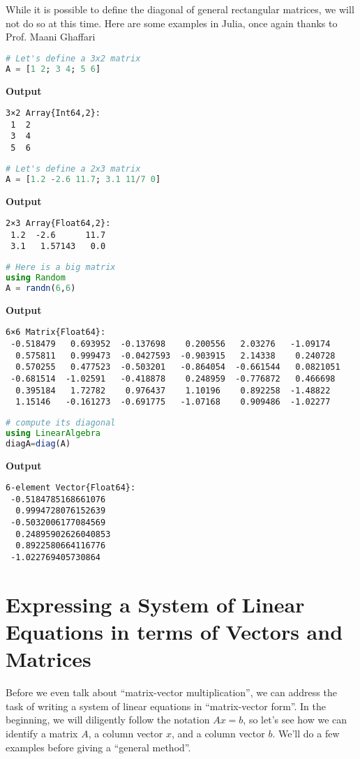 While it is possible to define the diagonal of general rectangular matrices, we will not do so at this time. Here are some examples in Julia, once again thanks to Prof. Maani Ghaffari
\begin{lstlisting}[language=Julia,style=mystyle]
# Let's define a 3x2 matrix
A = [1 2; 3 4; 5 6]
\end{lstlisting}
\textbf{Output}
\begin{verbatim}
3×2 Array{Int64,2}:
 1  2
 3  4
 5  6
\end{verbatim}
\begin{lstlisting}[language=Julia,style=mystyle]
# Let's define a 2x3 matrix
A = [1.2 -2.6 11.7; 3.1 11/7 0]
\end{lstlisting}
\textbf{Output}
\begin{verbatim}
2×3 Array{Float64,2}:
 1.2  -2.6      11.7
 3.1   1.57143   0.0
\end{verbatim}
\begin{lstlisting}[language=Julia,style=mystyle]
# Here is a big matrix
using Random
A = randn(6,6)
\end{lstlisting}
\textbf{Output}
\begin{verbatim}
6×6 Matrix{Float64}:
 -0.518479   0.693952  -0.137698    0.200556   2.03276   -1.09174
  0.575811   0.999473  -0.0427593  -0.903915   2.14338    0.240728
  0.570255   0.477523  -0.503201   -0.864054  -0.661544   0.0821051
 -0.681514  -1.02591   -0.418878    0.248959  -0.776872   0.466698
  0.395184   1.72782    0.976437    1.10196    0.892258  -1.48822
  1.15146   -0.161273  -0.691775   -1.07168    0.909486  -1.02277
\end{verbatim}
\begin{lstlisting}[language=Julia,style=mystyle]
# compute its diagonal
using LinearAlgebra
diagA=diag(A)
\end{lstlisting}
\textbf{Output}
\begin{verbatim}
6-element Vector{Float64}:
 -0.5184785168661076
  0.9994728076152639
 -0.5032006177084569
  0.24895902626040853
  0.8922580664116776
 -1.022769405730864
\end{verbatim}

\section{Expressing a System of Linear Equations in terms of Vectors and Matrices}

Before we even talk about ``matrix-vector multiplication'', we can address the task of writing a system of linear equations in ``matrix-vector form''. In the beginning, we will diligently follow the notation $Ax=b$, so let's see how we can identify a matrix $A$, a column vector $x$, and a column vector $b$. We'll do a few examples before giving a ``general method''. 


